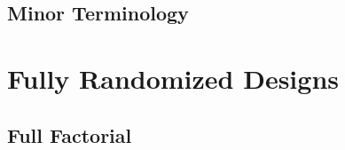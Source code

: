 \subsection{Minor Terminology}















\section{Fully Randomized Designs}

\subsection{Full Factorial}

